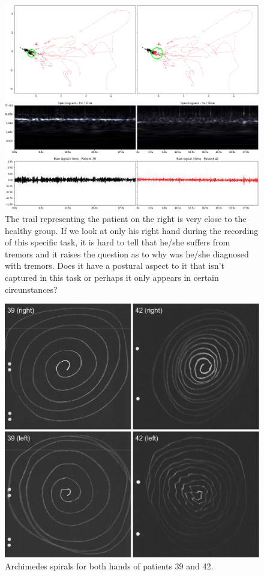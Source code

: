 \begin{figure}[ht]
\centering
\includegraphics[width=\linewidth]{figures/nemo/exp1-3942.png}
\caption{The trail representing the patient on the right is very close to the healthy group. If we look at only his right hand during the recording of this specific task, it is hard to tell that he/she suffers from tremors and it raises the question as to why was he/she diagnosed with tremors. Does it have a postural aspect to it that isn't captured in this task or perhaps it only appears in certain circunstances? }
\label{fig:exp1-3942}
\end{figure}


\begin{figure}[ht]
\centering
\includegraphics[width=.7\linewidth]{figures/nemo/4-spirals.pdf}
\caption{Archimedes spirals for both hands of patients 39 and 42.}
\label{fig:spirals}
\end{figure}
    


